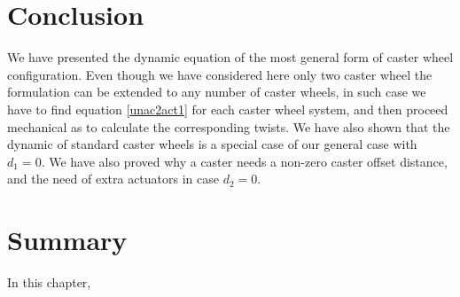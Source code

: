\section{Conclusion}
We have presented the dynamic equation of the most general form of caster wheel configuration. Even though we have considered here only two caster wheel the formulation can be extended to any number of caster wheels, in such case we have to find equation \ref{unac2act1} for each caster wheel system, and then proceed mechanical as to calculate the corresponding twists. We have also shown that the  dynamic of standard caster wheels is a special case of our general case with $d_1=0$. We have also proved why a caster needs a non-zero caster offset distance, and the  need of extra actuators in case $d_2=0$.
    



\section{Summary}
In this chapter, 

